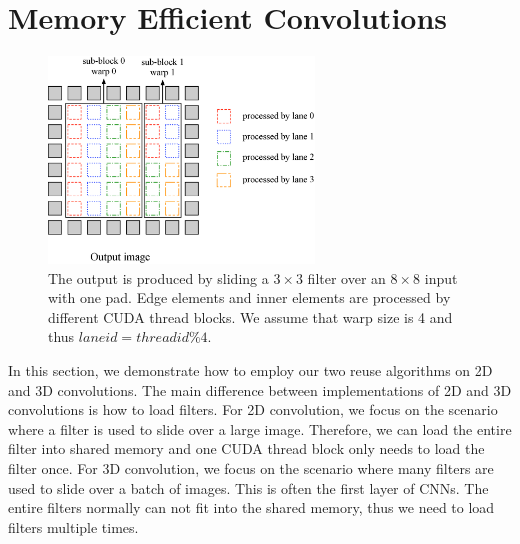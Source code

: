 \section{Memory Efficient Convolutions}
\begin{figure}
	\centering
	\includegraphics[width=0.9\columnwidth,height=5.5cm]{./figure/overalldesign.eps}
\caption{The output is produced by sliding a $3 \times 3$ filter over an $8 \times 8$ input with one pad. Edge elements and inner elements are processed by different CUDA thread blocks. We assume that warp size is 4 and thus $laneid=threadid\%4$.}
\label{fig:overalldesign}
\end{figure}


In this section, we demonstrate how to employ our two reuse algorithms on 2D and 3D convolutions. The main difference between
implementations of 2D and 3D convolutions is how to load filters. For 2D convolution, we focus on the scenario where a filter is used to
slide over a large image. Therefore, we can load the entire filter into shared memory and one CUDA thread block only needs to load the
filter once. For 3D convolution, we focus on the scenario where many filters are used to slide over a batch of images. This is often the
first layer of CNNs. The entire filters normally can not fit into the shared memory, thus we need to load filters multiple times.

